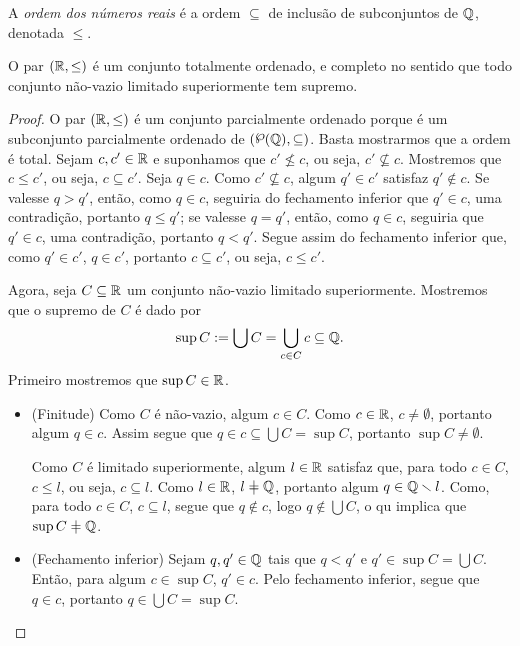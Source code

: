 \begin{definition}
A \emph{ordem dos números reais} é a ordem $\subseteq$ de inclusão de subconjuntos de $\mathbb{Q}$, denotada $\leq$.
\end{definition}

\begin{proposition}
O par $(\mathbb{R},\leq)$ é um conjunto totalmente ordenado, e completo no sentido que todo conjunto não-vazio limitado superiormente tem supremo.
\end{proposition}
\begin{proof}
O par $(\mathbb{R},\leq)$ é um conjunto parcialmente ordenado porque é um subconjunto parcialmente ordenado de $(\p(\Q),\subseteq)$. Basta mostrarmos que a ordem é total. Sejam $c,c' \in \mathbb{R}$ e suponhamos que $c' \nleq c$, ou seja, $c' \nsubseteq c$. Mostremos que $c \leq c'$, ou seja, $c \subseteq c'$. Seja $q \in c$. Como $c' \nsubseteq c$, algum $q' \in c'$ satisfaz $q' \notin c$. Se valesse $q > q'$, então, como $q \in c$, seguiria do fechamento inferior que $q' \in c$, uma contradição, portanto $q \leq q'$; se valesse $q = q'$, então, como $q \in c$, seguiria que $q' \in c$, uma contradição, portanto $q < q'$. Segue assim do fechamento inferior que, como $q' \in c'$, $q \in c'$, portanto $c \subseteq c'$, ou seja, $c \leq c'$.

Agora, seja $C \subseteq \mathbb{R}$ um conjunto não-vazio limitado superiormente. Mostremos que o supremo de $C$ é dado por
	\begin{equation*}
	\sup C := \bigcup C = \bigcup_{c \in C} c \subseteq \mathbb{Q}.
	\end{equation*}
Primeiro mostremos que $\sup C \in \mathbb{R}$.
	\begin{itemize}
	\item (Finitude) Como $C$ é não-vazio, algum $c \in C$. Como $c \in \mathbb{R}$, $c \neq \emptyset$, portanto algum $q \in c$. Assim segue que $q \in c \subseteq \bigcup C = \sup C$, portanto $\sup C \neq \emptyset$.

	Como $C$ é limitado superiormente, algum $l \in \mathbb{R}$ satisfaz que, para todo $c \in C$, $c \leq l$, ou seja, $c \subseteq l$. Como $l \in \mathbb{R}$, $l \neq \Q$, portanto algum $q \in \mathbb{Q} \smallsetminus l$. Como, para todo $c \in C$, $c \subseteq l$, segue que $q \notin c$, logo $q \notin \bigcup C$, o qu implica que $\sup C \neq \Q$.

	\item (Fechamento inferior) Sejam $q,q' \in \mathbb{Q}$ tais que $q < q'$ e $q' \in \sup C = \bigcup C$. Então, para algum $c \in \sup C$, $q' \in c$. Pelo fechamento inferior, segue que $q \in c$, portanto $q \in \bigcup C = \sup C$.


\end{itemize}
\end{proof}
